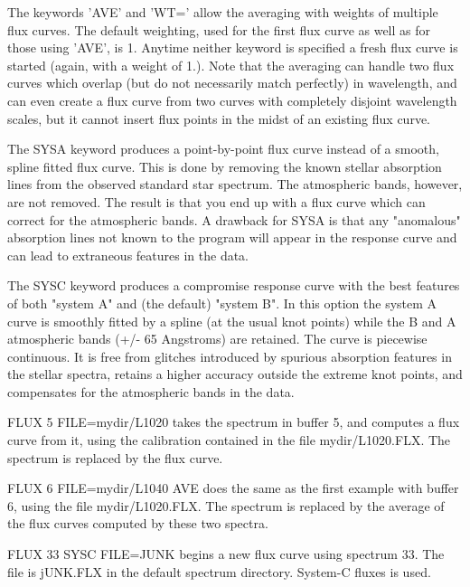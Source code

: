 The keywords 'AVE' and 'WT=' allow the averaging with weights of multiple
flux curves.  The default weighting, used for the first flux curve as well
as for those using 'AVE', is 1.  Anytime neither keyword is specified a
fresh flux curve is started (again, with a weight of 1.).  Note that the
averaging can handle two flux curves which overlap (but do not necessarily
match perfectly) in wavelength, and can even create a flux curve from two
curves with completely disjoint wavelength scales, but it cannot insert
flux points in the midst of an existing flux curve.

The SYSA keyword produces a point-by-point flux curve instead of a smooth,
spline fitted flux curve.  This is done by removing the known stellar
absorption lines from the observed standard star spectrum. The atmospheric
bands, however, are not removed.  The result is that you end up with a flux
curve which can correct for the atmospheric bands.  A drawback for SYSA is
that any "anomalous" absorption lines not known to the program will appear
in the response curve and can lead to extraneous features in the data.

The SYSC keyword produces a compromise response curve with the best
features of both "system A" and (the default) "system B".  In this option
the system A curve is smoothly fitted by a spline (at the usual knot
points) while the B and A atmospheric bands (+/- 65 Angstroms) are
retained.  The curve is piecewise continuous.  It is free from glitches
introduced by spurious absorption features in the stellar spectra, retains
a higher accuracy outside the extreme knot points, and compensates for the
atmospheric bands in the data.

\begin{example}
  \item[FLUX 5 FILE=mydir/L1020\hfill]{takes the spectrum in buffer 5, and
       computes a flux curve from it, using the calibration contained in
       the file mydir/L1020.FLX.  The spectrum is replaced by the flux
       curve.}

  \item[FLUX 6 FILE=mydir/L1040 AVE\hfill]{does the same as the first
       example with buffer 6, using the file mydir/L1020.FLX.  The spectrum
       is replaced by the average of the flux curves computed by these two
       spectra.}

  \item[FLUX 33 SYSC FILE=JUNK\hfill]{begins a new flux curve using
       spectrum 33.  The file is jUNK.FLX in the default spectrum
       directory.  System-C fluxes is used.}
\end{example}


